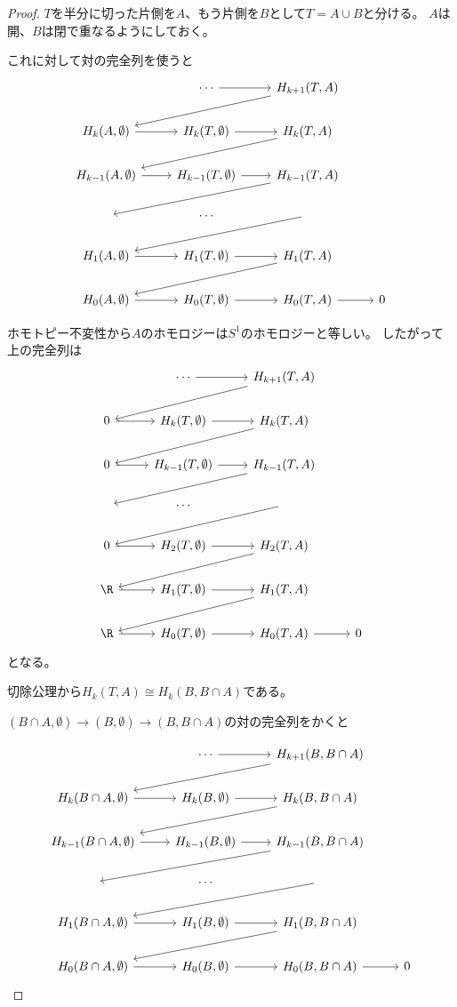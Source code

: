 \documentclass{jsarticle}
\begin{document}
\begin{proof}
$T$を半分に切った片側を$A$、もう片側を$B$として$T=A\cup B$と分ける。
$A$は開、$B$は閉で重なるようにしておく。

これに対して対の完全列を使うと
\[
\begin{tikzcd}
~ &\cdots \ar[r] &H_{k+1}(T,A) \ar[dll]\\
H_k(A,\emptyset) \ar[r] &H_k(T,\emptyset) \ar[r] &H_k(T,A) \ar[dll]\\
H_{k-1}(A,\emptyset) \ar[r] &H_{k-1}(T,\emptyset) \ar[r] &H_{k-1}(T,A) \ar[dll]\\
~&\cdots&\ar[dll]\\
H_{1}(A,\emptyset) \ar[r] &H_{1}(T,\emptyset) \ar[r] &H_{1}(T,A) \ar[dll]\\
H_{0}(A,\emptyset) \ar[r] &H_{0}(T,\emptyset) \ar[r] &H_{0}(T,A) \ar[r]&0
\end{tikzcd}
\]

ホモトピー不変性から$A$のホモロジーは$S^1$のホモロジーと等しい。
したがって上の完全列は
\[
\begin{tikzcd}
~ &\cdots \ar[r] &H_{k+1}(T,A) \ar[dll]\\
0 \ar[r] &H_k(T,\emptyset) \ar[r] &H_k(T,A) \ar[dll]\\
0 \ar[r] &H_{k-1}(T,\emptyset) \ar[r] &H_{k-1}(T,A) \ar[dll]\\
~&\cdots&\ar[dll]\\
0 \ar[r] &H_{2}(T,\emptyset) \ar[r] &H_{2}(T,A) \ar[dll]\\
\R \ar[r] &H_{1}(T,\emptyset) \ar[r] &H_{1}(T,A) \ar[dll]\\
\R \ar[r] &H_{0}(T,\emptyset) \ar[r] &H_{0}(T,A) \ar[r]&0
\end{tikzcd}
\]
となる。

切除公理から$H_k(T,A)\cong H_k(B,B\cap A)$である。

$(B\cap A,\emptyset)\to(B,\emptyset)\to(B,B\cap A)$の対の完全列をかくと

\[
\begin{tikzcd}
~ &\cdots \ar[r] &H_{k+1}(B,B\cap A) \ar[dll]\\
H_k(B\cap A,\emptyset) \ar[r] &H_k(B,\emptyset) \ar[r] &H_k(B,B\cap A) \ar[dll]\\
H_{k-1}(B\cap A,\emptyset) \ar[r] &H_{k-1}(B,\emptyset) \ar[r] &H_{k-1}(B,B\cap A) \ar[dll]\\
~&\cdots&\ar[dll]\\
H_{1}(B\cap A,\emptyset) \ar[r] &H_{1}(B,\emptyset) \ar[r] &H_{1}(B,B\cap A) \ar[dll]\\
H_{0}(B\cap A,\emptyset) \ar[r] &H_{0}(B,\emptyset) \ar[r] &H_{0}(B,B\cap A) \ar[r]&0
\end{tikzcd}
\]


\end{proof}
\end{document}
